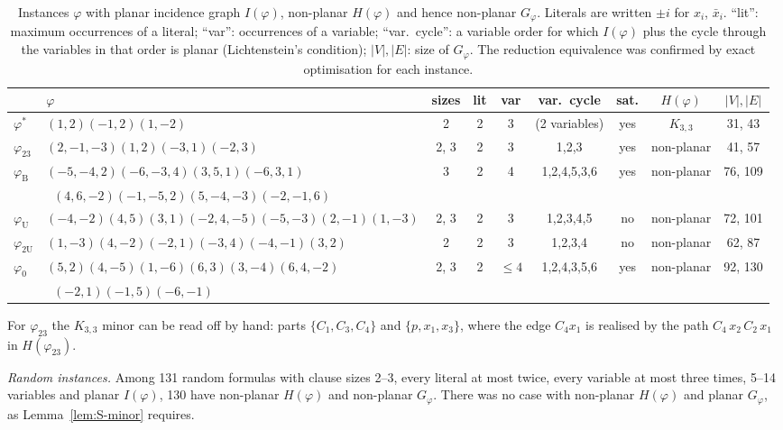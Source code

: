 \documentclass[aps,pre,onecolumn,superscriptaddress,nofootinbib]{revtex4-2}
\theoremstyle{remark}
\begin{document}
\begin{table}[h]
\caption{Instances $\varphi$ with planar incidence graph $I(\varphi)$, non-planar $H(\varphi)$ and
hence non-planar $G_\varphi$. Literals are written $\pm i$ for $x_i$, $\bar x_i$. ``lit'': maximum
occurrences of a literal; ``var'': occurrences of a variable; ``var.\ cycle'': a variable order for
which $I(\varphi)$ plus the cycle through the variables in that order is planar (Lichtenstein's
condition); $|V|,|E|$: size of $G_\varphi$. The reduction equivalence was confirmed by exact
optimisation for each instance.}
\label{tab:S-inst}
\begin{ruledtabular}
\begin{tabular}{llccccccc}
& $\varphi$ & sizes & lit & var & var.\ cycle & sat. & $H(\varphi)$ & $|V|,|E|$\\
\hline
$\varphi^*$ & $(1,2)(-1,2)(1,-2)$ & 2 & 2 & 3 & (2 variables) & yes & $K_{3,3}$ & 31, 43\\
$\varphi_{23}$ & $(2,-1,-3)(1,2)(-3,1)(-2,3)$ & 2, 3 & 2 & 3 & 1,2,3 & yes & non-planar & 41, 57\\
$\varphi_{\mathrm B}$ & $(-5,-4,2)(-6,-3,4)(3,5,1)(-6,3,1)$ & 3 & 2 & 4 & 1,2,4,5,3,6 & yes & non-planar & 76, 109\\
 & $\;\;(4,6,-2)(-1,-5,2)(5,-4,-3)(-2,-1,6)$ & & & & & & & \\
$\varphi_{\mathrm U}$ & $(-4,-2)(4,5)(3,1)(-2,4,-5)(-5,-3)(2,-1)(1,-3)$ & 2, 3 & 2 & 3 & 1,2,3,4,5 & no & non-planar & 72, 101\\
$\varphi_{2\mathrm U}$ & $(1,-3)(4,-2)(-2,1)(-3,4)(-4,-1)(3,2)$ & 2 & 2 & 3 & 1,2,3,4 & no & non-planar & 62, 87\\
$\varphi_0$ & $(5,2)(4,-5)(1,-6)(6,3)(3,-4)(6,4,-2)$ & 2, 3 & 2 & $\le4$ & 1,2,4,3,5,6 & yes & non-planar & 92, 130\\
 & $\;\;(-2,1)(-1,5)(-6,-1)$ & & & & & & & \\
\end{tabular}
\end{ruledtabular}
\end{table}

For $\varphi_{23}$ the $K_{3,3}$ minor can be read off by hand: parts $\{C_1,C_3,C_4\}$ and
$\{p,x_1,x_3\}$, where the edge $C_4x_1$ is realised by the path $C_4\,x_2\,C_2\,x_1$ in
$H(\varphi_{23})$.

\emph{Random instances.} Among 131 random formulas with clause sizes 2--3, every literal at most
twice, every variable at most three times, 5--14 variables and planar $I(\varphi)$, 130 have
non-planar $H(\varphi)$ and non-planar $G_\varphi$. There was no case with non-planar $H(\varphi)$
and planar $G_\varphi$, as Lemma~\ref{lem:S-minor} requires.
\end{document}
